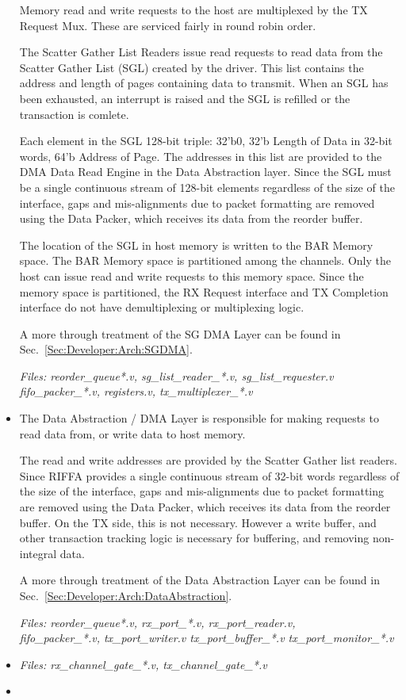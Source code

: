\documentclass{refrep}
\begin{document}
\begin{itemize}
  Memory read and write requests to the host are multiplexed by the TX Request
  Mux. These are serviced fairly in round robin order.
  
  The Scatter Gather List Readers issue read requests to read data from the
  Scatter Gather List (SGL) created by the driver. This list contains the
  address and length of pages containing data to transmit. When an SGL has been
  exhausted, an interrupt is raised and the SGL is refilled or the transaction
  is comlete.

  Each element in the SGL 128-bit triple: {32'b0, 32'b Length of Data in 32-bit
    words, 64'b Address of Page}. The addresses in this list are provided to the
  DMA Data Read Engine in the Data Abstraction layer. Since the SGL must be a
  single continuous stream of 128-bit elements regardless of the size of the
  interface, gaps and mis-alignments due to packet formatting are removed using
  the Data Packer, which receives its data from the reorder buffer.
  
  The location of the SGL in host memory is written to the BAR Memory space.
  The BAR Memory space is partitioned among the channels. Only the host can
  issue read and write requests to this memory space. Since the memory space is
  partitioned, the RX Request interface and TX Completion interface do not have
  demultiplexing or multiplexing logic.

  A more through treatment of the SG DMA Layer can be found in Sec.~\ref{Sec:Developer:Arch:SGDMA}.

  \textit{Files: reorder\_queue*.v, sg\_list\_reader\_*.v, sg\_list\_requester.v \\ 
    fifo\_packer\_*.v, registers.v, tx\_multiplexer\_*.v}


\item \textbf{\color{blue}{Data Abstraction / DMA Layer}} The Data Abstraction /
  DMA Layer is responsible for making requests to read data from, or write data
  to host memory.

  The read and write addresses are provided by the Scatter Gather list
  readers. Since RIFFA provides a single continuous stream of 32-bit words
  regardless of the size of the interface, gaps and mis-alignments due to packet
  formatting are removed using the Data Packer, which receives its data from the
  reorder buffer. On the TX side, this is not necessary. However a write buffer,
  and other transaction tracking logic is necessary for buffering, and removing
  non-integral data.

  A more through treatment of the Data Abstraction Layer can be found in
  Sec.~\ref{Sec:Developer:Arch:DataAbstraction}.

  \textit{Files: reorder\_queue*.v, rx\_port\_*.v, rx\_port\_reader.v,\\
    fifo\_packer\_*.v, tx\_port\_writer.v tx\_port\_buffer\_*.v tx\_port\_monitor\_*.v}

\item \textbf{\color{purple}{Channel Interface}}
  \textit{Files: rx\_channel\_gate\_*.v, tx\_channel\_gate\_*.v}
\contourlength{.2pt}
\item {}
\end{itemize}
\end{document}
